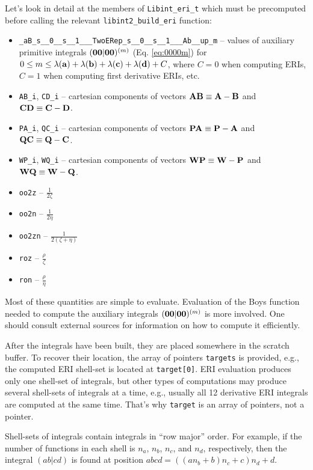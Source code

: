 \documentclass[10pt]{article}
\begin{document}
Let's look in detail at the members of {\tt Libint\_eri\_t} which must be precomputed before
calling the relevant {\tt libint2\_build\_eri} function:
\begin{itemize}
\item {\tt \_aB\_s\_\_0\_\_s\_\_1\_\_\_TwoERep\_s\_\_0\_\_s\_\_1\_\_\_Ab\_\_up\_m} --
values of auxiliary primitive integrals $({\bf 00}|{\bf 00})^{(m)}$ (Eq.
\eqref{eq:0000m}) for $0 \leq m \leq \lambda({\bf a}) + \lambda({\bf b}) +
\lambda({\bf c}) + \lambda({\bf d}) + C$, where $C = 0$ when computing ERIs, $C=1$ when computing first derivative ERIs, etc.
\item {\tt AB\_i}, {\tt CD\_i} -- cartesian components of vectors ${\bf AB} \equiv {\bf A} - {\bf B}$
and ${\bf CD} \equiv {\bf C} - {\bf D}$.
\item {\tt PA\_i}, {\tt QC\_i} -- cartesian components of vectors ${\bf PA} \equiv {\bf P} - {\bf A}$
and ${\bf QC} \equiv {\bf Q} - {\bf C}$.
\item {\tt WP\_i}, {\tt WQ\_i} -- cartesian components of vectors ${\bf WP} \equiv {\bf W} - {\bf P}$
and ${\bf WQ} \equiv {\bf W} - {\bf Q}$.
\item {\tt oo2z} -- $\frac{1}{2\zeta}$
\item {\tt oo2n} -- $\frac{1}{2\eta}$
\item {\tt oo2zn} -- $\frac{1}{2(\zeta+\eta)}$
\item {\tt roz} -- $\frac{\rho}{\zeta}$
\item {\tt ron} -- $\frac{\rho}{\eta}$
\end{itemize}
Most of these quantities are simple to evaluate. Evaluation of the Boys function needed to compute
the auxiliary integrals $({\bf 00}|{\bf 00})^{(m)}$ is more involved.
One should consult external sources for information on how
to compute it efficiently.\cite{Gill91}

After the integrals have been built, they are placed somewhere in the scratch buffer.
To recover their location, the array of pointers {\tt targets} is provided, e.g.,
the computed ERI shell-set is located at {\tt target[0]}.
ERI evaluation produces only one shell-set of integrals, but other types of computations
may produce several shell-sets of integrals at a time, e.g., usually all 12 derivative
ERI integrals are computed at the same time. That's why {\tt target} is an array of pointers, not a pointer.

Shell-sets of integrals contain integrals in ``row major'' order.\cite{KnuthACP} For example, if
the number of functions in each shell is $n_a$, $n_b$, $n_c$, and $n_d$, respectively,
then the integral $(ab|cd)$ is found at position $abcd = ( (a n_b + b) n_c + c) n_d + d$.
\end{document}
